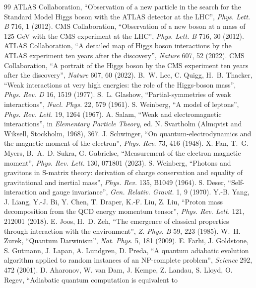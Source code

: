\documentclass[11pt,a4paper]{article}
\theoremstyle{definition}
\begin{document}
\begin{thebibliography}{99}
 ATLAS Collaboration, ``Observation of a new particle in the search for the Standard Model Higgs boson with the ATLAS
detector at the LHC'', \emph{Phys. Lett. B} 716, 1 (2012).
 CMS Collaboration, ``Observation of a new boson at a mass of 125 GeV with the CMS experiment at the LHC'', \emph{Phys.
Lett. B} 716, 30 (2012).
 ATLAS Collaboration, ``A detailed map of Higgs boson interactions by the ATLAS experiment ten years after the
discovery'', \emph{Nature} 607, 52 (2022).
 CMS Collaboration, ``A portrait of the Higgs boson by the CMS experiment ten years after the discovery'', \emph{Nature}
607, 60 (2022).
 B.~W. Lee, C. Quigg, H.~B. Thacker, ``Weak interactions at very high energies: the role of the Higgs-boson mass'',
\emph{Phys. Rev. D} 16, 1519 (1977).
 S.~L. Glashow, ``Partial-symmetries of weak interactions'', \emph{Nucl. Phys.} 22, 579 (1961).
 S. Weinberg, ``A model of leptons'', \emph{Phys. Rev. Lett.} 19, 1264 (1967).
 A. Salam, ``Weak and electromagnetic interactions'', in \emph{Elementary Particle Theory}, ed. N. Svartholm (Almqvist and
Wiksell, Stockholm, 1968), 367.
 J. Schwinger, ``On quantum-electrodynamics and the magnetic moment of the electron'', \emph{Phys. Rev.} 73, 416
(1948).
 X. Fan, T.~G. Myers, B.~A.~D. Sukra, G. Gabrielse, ``Measurement of the electron magnetic moment'', \emph{Phys. Rev. Lett.}
130, 071801 (2023).
 S. Weinberg, ``Photons and gravitons in S-matrix theory: derivation of charge conservation and equality of
gravitational and inertial mass'', \emph{Phys. Rev.} 135, B1049 (1964).
 S. Deser, ``Self-interaction and gauge invariance'', \emph{Gen. Relativ. Gravit.} 1, 9 (1970).
 Y.-B. Yang, J. Liang, Y.-J. Bi, Y. Chen, T. Draper, K.-F. Liu, Z. Liu, ``Proton mass decomposition from the QCD energy
momentum tensor'', \emph{Phys. Rev. Lett.} 121, 212001 (2018).
 E. Joos, H.~D. Zeh, ``The emergence of classical properties through interaction with the environment'', \emph{Z. Phys. B}
59, 223 (1985).
 W.~H. Zurek, ``Quantum Darwinism'', \emph{Nat. Phys.} 5, 181 (2009).
 E. Farhi, J. Goldstone, S. Gutmann, J. Lapan, A. Lundgren, D. Preda, ``A quantum adiabatic evolution algorithm applied
to random instances of an NP-complete problem'', \emph{Science} 292, 472 (2001).
 D. Aharonov, W. van Dam, J. Kempe, Z. Landau, S. Lloyd, O. Regev, ``Adiabatic quantum computation is equivalent to

\end{thebibliography}
\end{document}

